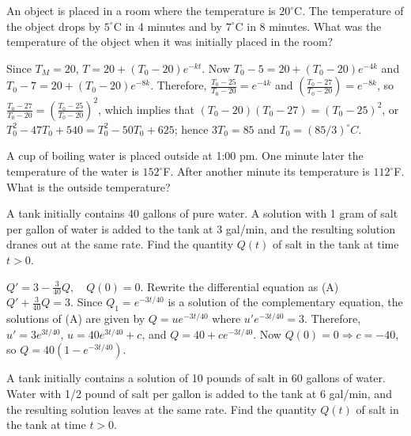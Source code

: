 \documentclass{ximera}
\begin{document}
\begin{problem}\label{exer:4.2.6}
An object is placed in a room where the temperature is
$20^\circ$C.  The temperature of the object drops by
$5^\circ$C in 4 minutes and by $7^\circ$C in 8 minutes.
What was the temperature of the object when it was initially
placed in the room?

\begin{solution}
Since $T_M=20$, $T=20+(T_0-20)e^{-kt}$. Now
$T_0-5=20+(T_0-20)e^{-4k}$  and $T_0-7=20+(T_0-20)e^{-8k}$. Therefore,
$\frac{T_0-25}{T_0-20}=e^{-4k}$ and $\left(\frac{T_0-27}{T_0-20}\right)=e^{-8k}$, so  $\frac{T_0-27}{T_0-20}=\left(\frac{T_0-25}{T_0-20}\right)^2$,
which implies that $(T_0-20)(T_0-27)=(T_0-25)^2$, or
$T_0^2-47T_0+540=T_0^2-50T_0+625$; hence $3T_0=85$
and  $T_0={(85/3)^\circ C}$.
\end{solution}
\end{problem}

\begin{problem}\label{exer:4.2.7}
A cup of boiling water is placed outside at 1:00 {\sc pm}.  One
minute later the temperature of the water is $152^\circ$F.
After another minute its temperature is $112^\circ$F.  What
is the outside temperature?
\end{problem}

\begin{problem}\label{exer:4.2.8}
A tank initially contains 40 gallons of pure water.  A
solution with 1 gram of salt per gallon of water is added
to the tank at 3 gal/min, and the  resulting
solution dranes out at the same rate.  Find the quantity $Q(t)$
of salt in the tank at time $t > 0$.

\begin{solution}
$Q'=3-\frac{3}{40}Q,\quad Q(0)=0$. Rewrite the differential equation
as (A) $Q'+\frac{3}{40}Q=3$. Since $Q_1=e^{-3t/40}$ is a solution of
the complementary equation, the solutions of (A) are given by
$Q=ue^{-3t/40}$ where $u'e^{-3t/40}=3$. Therefore,$u'=3e^{3t/40}$,
$u=40e^{3t/40}+c$, and $Q=40+ce^{-3t/40}$. Now $Q(0)=0\Rightarrow
c=-40$, so $Q=40(1-e^{-3t/40})$.
\end{solution}
\end{problem}

\begin{problem}\label{exer:4.2.9}
A tank initially contains a solution of 10 pounds of salt in
60 gallons of water.  Water with 1/2 pound of salt per
gallon is added to the tank at 6 gal/min, and the
 resulting solution leaves at the same rate.
Find the quantity $Q(t)$ of salt in the tank at time
$t > 0$.
\end{problem}
\end{document}
